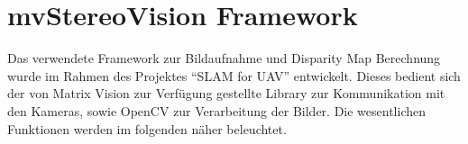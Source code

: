 \section{mvStereoVision Framework}
\label{sec:framework}
Das verwendete Framework zur Bildaufnahme und Disparity Map Berechnung wurde im Rahmen des Projektes “SLAM for UAV” entwickelt. Dieses bedient sich der von Matrix Vision zur Verfügung gestellte Library \cite{matrixvision} zur Kommunikation mit den Kameras, sowie OpenCV \cite{opencv} zur Verarbeitung der Bilder. Die wesentlichen Funktionen werden im folgenden näher beleuchtet.



